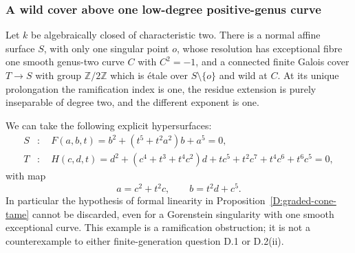\subsubsection{A wild cover above one low-degree positive-genus curve}

\begin{example}
\label{D:wild-genus2-single-curve}
Let $k$ be algebraically closed of characteristic two.  There is
a normal affine surface $S$, with only one singular point $o$,
whose resolution has exceptional fibre one smooth genus-two
curve $C$ with $C^2=-1$, and a connected finite Galois cover
$T\to S$ with group $\mathbb Z/2\mathbb Z$ which is \'etale
over $S\setminus\{o\}$ and wild at $C$.  At its unique
prolongation the ramification index is one, the residue
extension is purely inseparable of degree two, and the
different exponent is one.

We can take the following explicit hypersurfaces:
\[
 \begin{aligned}
 S&:\quad F(a,b,t)=b^2+(t^5+t^2a^2)b+a^5=0,\\
 T&:\quad H(c,d,t)=d^2+(c^4+t^3+t^4c^2)d
            +tc^5+t^2c^7+t^4c^6+t^6c^5=0,
 \end{aligned}
\]
with map
\[
                 a=c^2+t^2c,\qquad b=t^2d+c^5.
 \tag{M}
\]
In particular the hypothesis of formal linearity in
Proposition~\ref{D:graded-cone-tame} cannot be discarded,
even for a Gorenstein singularity with one smooth exceptional
curve.  This example is a ramification obstruction; it is not
a counterexample to either finite-generation question D.1 or
D.2(ii).
\end{example}


